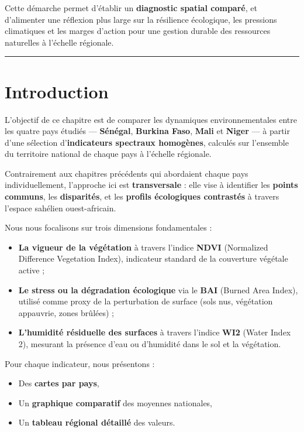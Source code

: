 \documentclass[
]{book}
\providecommand{\tightlist}{%
  \setlength{\itemsep}{0pt}\setlength{\parskip}{0pt}}
\begin{document}
Cette démarche permet d'établir un \textbf{diagnostic spatial comparé}, et d'alimenter une réflexion plus large sur la résilience écologique, les pressions climatiques et les marges d'action pour une gestion durable des ressources naturelles à l'échelle régionale.

\begin{center}\rule{0.5\linewidth}{0.5pt}\end{center}

\section{Introduction}\label{introduction-5}

L'objectif de ce chapitre est de comparer les dynamiques environnementales entre les quatre pays étudiés --- \textbf{Sénégal}, \textbf{Burkina Faso}, \textbf{Mali} et \textbf{Niger} --- à partir d'une sélection d'\textbf{indicateurs spectraux homogènes}, calculés sur l'ensemble du territoire national de chaque pays à l'échelle régionale.

Contrairement aux chapitres précédents qui abordaient chaque pays individuellement, l'approche ici est \textbf{transversale} : elle vise à identifier les \textbf{points communs}, les \textbf{disparités}, et les \textbf{profils écologiques contrastés} à travers l'espace sahélien ouest-africain.

Nous nous focalisons sur trois dimensions fondamentales :

\begin{itemize}
\tightlist
\item
  \textbf{La vigueur de la végétation} à travers l'indice \textbf{NDVI} (Normalized Difference Vegetation Index), indicateur standard de la couverture végétale active ;
\item
  \textbf{Le stress ou la dégradation écologique} via le \textbf{BAI} (Burned Area Index), utilisé comme proxy de la perturbation de surface (sols nus, végétation appauvrie, zones brûlées) ;
\item
  \textbf{L'humidité résiduelle des surfaces} à travers l'indice \textbf{WI2} (Water Index 2), mesurant la présence d'eau ou d'humidité dans le sol et la végétation.
\end{itemize}

Pour chaque indicateur, nous présentons :

\begin{itemize}
\tightlist
\item
  Des \textbf{cartes par pays},
\item
  Un \textbf{graphique comparatif} des moyennes nationales,
\item
  Un \textbf{tableau régional détaillé} des valeurs.
\end{itemize}
\end{document}
